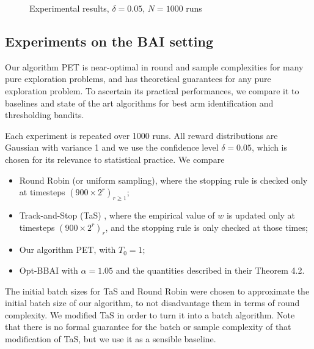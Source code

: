 \begin{figure*}[!ht]
	\centering
	\hspace{1em}
	 \hspace{1em}
	\label{fig:experiments}\caption{Experimental results, $\delta=0.05$, $N=1000$ runs}\end{figure*}
	
\subsection{Experiments on the BAI setting}


	
	
	

Our algorithm PET is near-optimal in round and sample complexities for many pure exploration problems, and has theoretical guarantees for any pure exploration problem. To ascertain its practical performances, we compare it to baselines and state of the art algorithms for best arm identification and thresholding bandits.	

Each experiment is repeated over 1000 runs. All reward distributions are Gaussian with variance 1 and we use the confidence level $\delta = 0.05$, which is chosen for its relevance to statistical practice. We compare
\begin{itemize}[noitemsep]
	\item Round Robin (or uniform sampling), where the stopping rule is checked only at timesteps $(900\times2^r)_{r \ge 1}$;
	\item Track-and-Stop (TaS) \citep{garivierOptimalBestArm2016}, where the empirical value of $w$ is updated only at timesteps $(900\times 2^r)_r$, and the stopping rule is only checked at those times;
	\item Our algorithm PET, with $T_0 = 1$;
	\item Opt-BBAI \citep{jinOptimalBatchedBest2023} with $\alpha = 1.05$ and the quantities described in their Theorem 4.2.
\end{itemize}
The initial batch sizes for TaS and Round Robin were chosen to approximate the initial batch size of our algorithm, to not disadvantage them in terms of round complexity. We modified TaS in order to turn it into a batch algorithm. Note that there is no formal guarantee for the batch or sample complexity of that modification of TaS, but we use it as a sensible baseline. 

